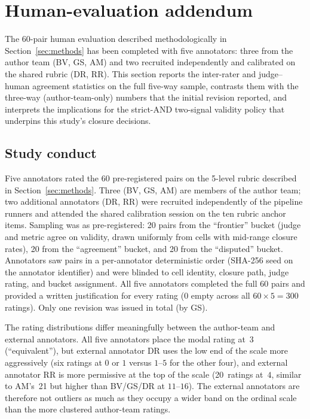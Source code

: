 \section{Human-evaluation addendum}
\label{sec:human_eval_addendum}

The 60-pair human evaluation described methodologically in
Section~\ref{sec:methods} has been completed with five annotators: three
from the author team (BV, GS, AM) and two recruited independently and
calibrated on the shared rubric (DR, RR). This section reports the
inter-rater and judge--human agreement statistics on the full five-way
sample, contrasts them with the three-way (author-team-only) numbers
that the initial revision reported, and interprets the implications for
the strict-AND two-signal validity policy that underpins this study's
closure decisions.

\subsection{Study conduct}
\label{sec:human_eval_conduct}

Five annotators rated the 60 pre-registered pairs on the 5-level rubric
described in Section~\ref{sec:methods}. Three (BV, GS, AM) are members
of the author team; two additional annotators (DR, RR) were recruited
independently of the pipeline runners and attended the shared calibration
session on the ten rubric anchor items. Sampling was as pre-registered:
20 pairs from the ``frontier'' bucket (judge and metric agree on
validity, drawn uniformly from cells with mid-range closure rates), 20
from the ``agreement'' bucket, and 20 from the ``disputed'' bucket.
Annotators saw pairs in a per-annotator deterministic order (SHA-256
seed on the annotator identifier) and were blinded to cell identity,
closure path, judge rating, and bucket assignment. All five annotators
completed the full 60 pairs and provided a written justification for
every rating (0 empty across all $60 \times 5 = 300$ ratings). Only
one revision was issued in total (by GS).

The rating distributions differ meaningfully between the author-team and
external annotators. All five annotators place the modal rating at~3
(``equivalent''), but external annotator DR uses the low end of the
scale more aggressively (six ratings at $0$ or $1$ versus $1$--$5$ for
the other four), and external annotator RR is more permissive at the
top of the scale (20~ratings at~$4$, similar to AM's~21 but higher than
BV/GS/DR at $11$--$16$). The external annotators are therefore not
outliers as much as they occupy a wider band on the ordinal scale than
the more clustered author-team ratings.

